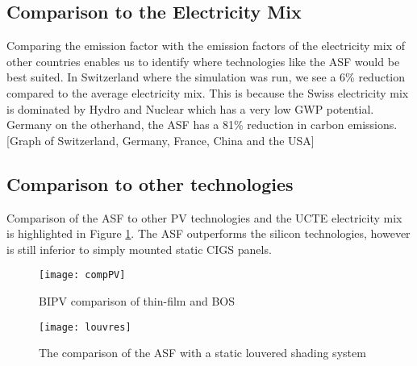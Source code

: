 
\subsection{Comparison to the Electricity Mix}
\label{ch:elecMix}

Comparing the emission factor with the emission factors of the electricity mix of other countries enables us to identify where technologies like the ASF would be best suited. In Switzerland where the simulation was run, we see a 6\% reduction compared to the average electricity mix. This is because the Swiss electricity mix is dominated by Hydro and Nuclear which has a very low GWP potential. Germany on the otherhand, the ASF has a 81\% reduction in carbon emissions. \\

[Graph of Switzerland, Germany, France, China and the USA]


\subsection{Comparison to other technologies}

Comparison of the ASF to other PV technologies and the UCTE electricity mix is highlighted in Figure \ref{fig:compPV}. The ASF outperforms the silicon technologies, however is still inferior to simply mounted static CIGS panels. 


\begin{figure}[H]
\begin{center}
\texttt{[image: compPV]}
\caption{BIPV comparison of thin-film and BOS}
\label{fig:compPV}
\end{center}
\end{figure}


\begin{figure}[H]
\begin{center}
\texttt{[image: louvres]}
\caption{The comparison of the ASF with a static louvered shading system}
\label{fig:louvres}
\end{center}
\end{figure}


